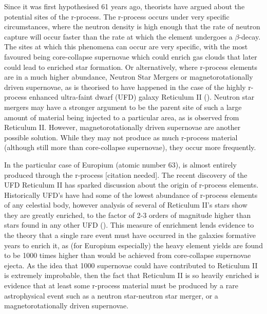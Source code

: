 \documentclass[a4paper,fleqn,usenatbib]{mnras}
\begin{document}
Since it was first hypothesised 61 years ago, theorists have argued about the potential sites of the r-process. The r-process occurs under very specific circumstances, where the neutron density is high enough that the rate of neutron capture will occur faster than the rate at which the element undergoes a $\beta$-decay. The sites at which this phenomena can occur are very specific, with the most favoured being core-collapse supernovae which could enrich gas clouds that later could lead to enriched star formation. Or alternatively, where r-process elements are in a much higher abundance, Neutron Star Mergers or magnetorotationally driven supernovae, as is theorised to have happened in the case of the highly r-process enhanced ultra-faint dwarf (UFD) galaxy Reticulum II (\cite{Ji2016}). Neutron star mergers may have a stronger argument to be the parent site of such a large amount of material being injected to a particular area, as is observed from Reticulum II. However, magnetorotationally driven supernovae are another possible solution. 
While they may not produce as much r-process material (although still more than core-collapse supernovae), they occur more frequently.

In the particular case of Europium (atomic number 63), is almost entirely produced through the r-process [citation needed]. The recent discovery of the UFD Reticulum II has sparked discussion about the origin of r-process elements.
 Historically UFD's have had some of the lowest abundance of r-process elements of any celestial body, however analysis of several of Reticulum II's stars show they are greatly enriched, to the factor of 2-3 orders of magnitude higher than stars found in any other UFD (\cite{Ji2016}). This measure of enrichment lends evidence to the theory that a single rare event must have occurred in the galaxies formative years to enrich it, as (for Europium especially) the heavy element yields are found to be 1000 times higher than would be achieved from core-collapse supernovae ejecta. As the idea that 1000 supernovae could have contributed to Reticulum II is extremely improbable, then the fact that Reticulum II is so heavily enriched is evidence that at least some r-process material must be produced by a rare astrophysical event such as a neutron star-neutron star merger, or a magnetorotationally driven supernovae.
\end{document}
